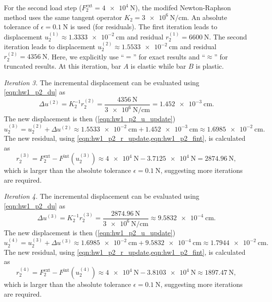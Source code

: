 For the second load step ($F_2^{\textrm{ext}} = \qty{4e+4}{\newton}$), the modifed Newton-Raphson method uses the same tangent operator $K_2 = \qty[per-mode=symbol]{3e+6}{\newton\per\centi\meter}$. 
An absolute tolerance of $\epsilon = \qty{0.1}{\newton}$ is used (for residuals). 
The first iteration leads to displacement $u_2^{(1)} \approx \qty{1.3333e-2}{\centi\meter}$ and residual $r_2^{(1)} = \qty{6600}{\newton}$.
The second iteration leads to displacement $u_2^{(2)} \approx \qty{1.5533e-2}{\centi\meter}$ and residual $r_2^{(2)} = \qty{4356}{\newton}$.
Here, we explicitly use ``$=$'' for exact results and ``$\approx$'' for truncated results.
At this iteration, bar $A$ is elastic while bar $B$ is plastic. 


\emph{Iteration 3.} The incremental displacement can be evaluated using \cref{eqn:hw1_p2_du} as 
\begin{equation*}
    \Delta u^{(2)} = K_2^{-1} r_2^{(2)} = \frac{\qty{4356}{\newton}}{\qty[per-mode=symbol]{3e+6}{\newton\per\centi\meter}} = \qty{1.452e-3}{\centi\meter}.
\end{equation*}
The new displacement is then (\cref{eqn:hw1_p2_u_update})
\begin{equation*}
    u_2^{(3)} = u_2^{(2)} + \Delta u^{(2)} \approx \qty{1.5533e-2}{\centi\meter} +  \qty{1.452e-3}{\centi\meter} \approx \qty{1.6985e-2}{\centi\meter}.
\end{equation*}
The new residual, using \cref{eqn:hw1_p2_r_update,eqn:hw1_p2_fint}, is calculated as 
\begin{equation*}
    r_2^{(3)} = F_2^{\textrm{ext}} - F^{\textrm{int}}(u_2^{(3)}) \approx \qty{4e+4}{\newton} - \qty{3.7125e+4}{\newton} = \qty{2874.96}{\newton},
\end{equation*}
which is larger than the absolute tolerance $\epsilon = \qty{0.1}{\newton}$, suggesting more iterations are required. 

\emph{Iteration 4.} The incremental displacement can be evaluated using \cref{eqn:hw1_p2_du} as 
\begin{equation*}
    \Delta u^{(3)} = K_2^{-1} r_2^{(3)} = \frac{\qty{2874.96}{\newton}}{\qty[per-mode=symbol]{3e+6}{\newton\per\centi\meter}} \approx \qty{9.5832e-4}{\centi\meter}.
\end{equation*}
The new displacement is then (\cref{eqn:hw1_p2_u_update})
\begin{equation*}
    u_2^{(4)} = u_2^{(3)} + \Delta u^{(3)} \approx \qty{1.6985e-2}{\centi\meter} +  \qty{9.5832e-4}{\centi\meter} \approx \qty{1.7944e-2}{\centi\meter}.
\end{equation*}
The new residual, using \cref{eqn:hw1_p2_r_update,eqn:hw1_p2_fint}, is calculated as 
\begin{equation*}
    r_2^{(4)} = F_2^{\textrm{ext}} - F^{\textrm{int}}(u_2^{(4)}) \approx \qty{4e+4}{\newton} - \qty{3.8103e+4}{\newton} \approx \qty{1897.47}{\newton},
\end{equation*}
which is larger than the absolute tolerance $\epsilon = \qty{0.1}{\newton}$, suggesting more iterations are required. 

